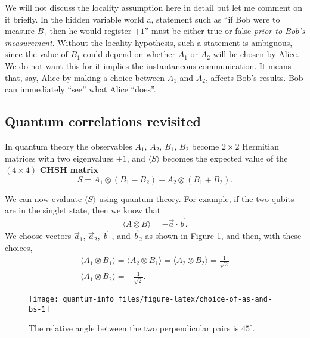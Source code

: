 \documentclass[fleqn]{article}
\begin{document}
We will not discuss the locality assumption here in detail but let me comment on it briefly.
In the hidden variable world a, statement such as ``if Bob were to measure \(B_1\) then he would register \(+1\)'' must be either true or false \emph{prior to Bob's measurement}.
Without the locality hypothesis, such a statement is ambiguous, since the value of \(B_1\) could depend on whether \(A_1\) or \(A_2\) will be chosen by Alice.
We do not want this for it implies the instantaneous communication.
It means that, say, Alice by making a choice between \(A_1\) and \(A_2\), affects Bob's results.
Bob can immediately ``see'' what Alice ``does''.

\hypertarget{quantum-correlations-revisited}{%
\subsection{Quantum correlations revisited}\label{quantum-correlations-revisited}}

In quantum theory the observables \(A_1\), \(A_2\), \(B_1\), \(B_2\) become \(2\times 2\) Hermitian matrices with two eigenvalues \(\pm 1\), and \(\langle S\rangle\) becomes the expected value of the \((4\times 4)\) \textbf{CHSH matrix}
\[
  S
  = A_1\otimes(B_1-B_2) + A_2\otimes(B_1+B_2).
\]

We can now evaluate \(\langle S\rangle\) using quantum theory.
For example, if the two qubits are in the singlet state, then we know that
\[
  \langle A\otimes B\rangle = -\vec{a}\cdot\vec{b}.
\]
We choose vectors \(\vec{a}_1\), \(\vec{a}_2\), \(\vec{b}_1\), and \(\vec{b}_2\) as shown in Figure \ref{fig:choice-of-as-and-bs}, and then, with these choices,
\[
\begin{gathered}
  \langle A_1\otimes B_1\rangle
  = \langle A_2\otimes B_1\rangle
  = \langle A_2\otimes B_2\rangle
  = \frac{1}{\sqrt 2}
\\\langle A_1\otimes B_2\rangle
   = -\frac{1}{\sqrt 2}.
\end{gathered}
\]



\begin{figure}[H]

{\centering \texttt{[image: quantum-info\_files/figure-latex/choice-of-as-and-bs-1]} 

}

\caption{The relative angle between the two perpendicular pairs is \(45^\circ\).}\label{fig:choice-of-as-and-bs}
\end{figure}
\end{document}
